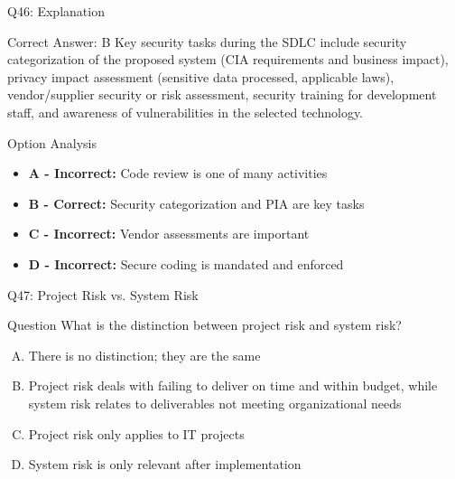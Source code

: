 \documentclass{beamer}
\begin{document}
	\begin{frame}{Q46: Explanation}
		\begin{block}{Correct Answer: B}
			Key security tasks during the SDLC include security categorization of the proposed system (CIA requirements and business impact), privacy impact assessment (sensitive data processed, applicable laws), vendor/supplier security or risk assessment, security training for development staff, and awareness of vulnerabilities in the selected technology.
		\end{block}
		\begin{block}{Option Analysis}
			\begin{itemize}
				\item \textbf{A - Incorrect:} Code review is one of many activities
				\item \textbf{B - Correct:} Security categorization and PIA are key tasks
				\item \textbf{C - Incorrect:} Vendor assessments are important
				\item \textbf{D - Incorrect:} Secure coding is mandated and enforced
			\end{itemize}
		\end{block}
	\end{frame}
	
	\begin{frame}{Q47: Project Risk vs. System Risk}
		\begin{block}{Question}
			What is the distinction between project risk and system risk?
		\end{block}
		\begin{enumerate}[(A)]
			\item There is no distinction; they are the same
			\item Project risk deals with failing to deliver on time and within budget, while system risk relates to deliverables not meeting organizational needs
			\item Project risk only applies to IT projects
			\item System risk is only relevant after implementation
		\end{enumerate}
	\end{frame}
	
\end{document}
